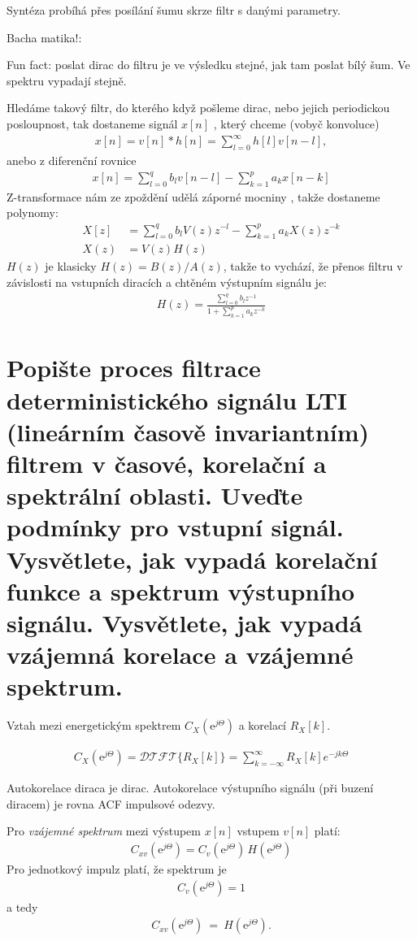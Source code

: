 \documentclass[a4paper,12pt]{article}   %
\newcommand{\mt}[1]{$#1$}
\newcommand{\ejt}{\text{e}^{j\Theta}}
\begin{document}
Syntéza probíhá přes posílání šumu skrze filtr s danými parametry. 

Bacha matika!:

Fun fact: poslat dirac do filtru je ve výsledku stejné, jak tam poslat bílý šum. Ve spektru vypadají stejně.

Hledáme takový filtr, do kterého když pošleme dirac, nebo jejich periodickou posloupnost, tak dostaneme signál \mt{x[n]} , který chceme (vobyč konvoluce)
\begin{align*}
        x[n] = v[n]\ast h[n] = \sum_{l=0}^\infty h[l]v[n-l],
\end{align*}
anebo z diferenční rovnice
\begin{align*}
        x[n] = \sum^q_{l=0} b_l v[n-l] - \sum^p_{k=1}a_k x[n-k]
\end{align*}
Z-transformace nám ze zpoždění udělá záporné mocniny , takže dostaneme polynomy:
\begin{align*}
        X[z] &= \sum^q_{l=0} b_l V(z)z^{-l} - \sum^p_{k=1}a_k X(z)z^{-k}\\
        X(z) &= V(z)H(z)
\end{align*}
\mt{H(z)} je klasicky \mt{H(z) = B(z)/A(z)}, takže to vychází, že přenos filtru v závislosti na vstupních diracích a chtěném výstupním signálu je:
\begin{align*}
        H(z) = \frac{\sum^q_{l=0} b_l z^{-1}}{1 + \sum^p_{k=1} a_k z^{-k}}
\end{align*}


\section{Popište proces filtrace deterministického signálu LTI (lineárním časově invariantním) filtrem v časové, korelační a spektrální oblasti. Uveďte podmínky pro vstupní signál. Vysvětlete, jak vypadá korelační funkce a spektrum výstupního signálu. Vysvětlete, jak vypadá vzájemná korelace a vzájemné spektrum.}


Vztah mezi energetickým spektrem $C_X(\ejt)$ a korelací \mt{R_X[k]}.

\begin{align*}
        C_X(\ejt) = \mathscr{DTFT}\{R_X[k]\} = \sum_{k=-\infty}^\infty R_X[k]e^{-jk\Theta}
\end{align*}

Autokorelace diraca je dirac. Autokorelace výstupního signálu (při buzení diracem) je rovna ACF impulsové odezvy. 

Pro \textit{vzájemné spektrum} mezi výstupem \mt{x[n]} vstupem \mt{v[n]} platí:
\begin{align*}
        C_{xv}(\ejt) = C_v(\ejt)\,H(\ejt)
\end{align*}
Pro jednotkový impulz platí, že spektrum je 
\begin{align*}
        C_v(\ejt) = 1
\end{align*}
a tedy
\begin{align*}
        C_{xv}(\ejt)~=~H(\ejt).
\end{align*}
\end{document}
